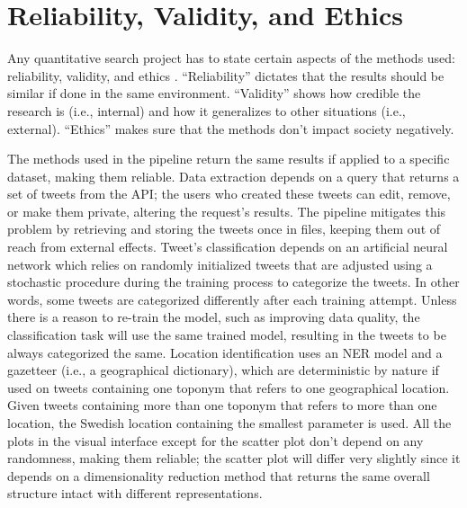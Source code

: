 \section{Reliability, Validity, and Ethics}

Any quantitative search project has to state certain aspects of the methods used: reliability,
validity, and ethics \cite{woodrowReliabilityValidityEthics2014}. ``Reliability'' dictates that the
results should be similar if done in the same environment. ``Validity'' shows how credible the
research is (i.e., internal) and how it generalizes to other situations (i.e., external). ``Ethics''
makes sure that the methods don't impact society negatively. 

The methods used in the pipeline return the same results if applied to a specific dataset, making
them reliable. Data extraction depends on a query that returns a set of tweets from the \ac{API};
the users who created these tweets can edit, remove, or make them private, altering the request's
results. The pipeline mitigates this problem by retrieving and storing the tweets once in files,
keeping them out of reach from external effects. Tweet's classification depends on an artificial
neural network which relies on randomly initialized tweets that are adjusted using a stochastic
procedure during the training process to categorize the tweets. In other words,  some tweets are
categorized differently after each training attempt. Unless there is a reason to re-train the model,
such as improving data quality, the classification task will use the same trained model, resulting
in the tweets to be always categorized the same. Location identification uses an \ac{NER} model and
a gazetteer (i.e., a geographical dictionary), which are deterministic by nature if used on tweets
containing one toponym that refers to one geographical location. Given tweets containing more than
one toponym that refers to more than one location, the Swedish location containing the smallest
parameter is used. All the plots in the visual interface except for the scatter plot don't depend on
any randomness, making them reliable; the scatter plot will differ very slightly since it depends on
a dimensionality reduction method that returns the same overall structure intact with different
representations.

